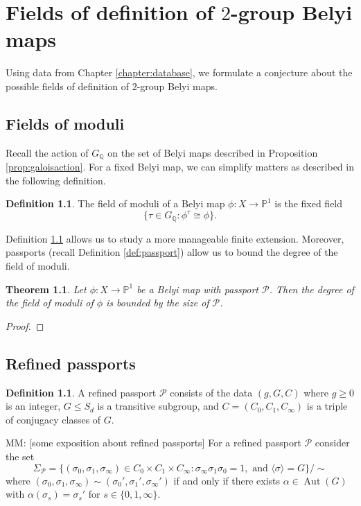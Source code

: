 \documentclass{dcthesis}
\newcommand{\PP}{\mathbb P}
\newcommand{\QQ}{\mathbb Q}
\newcommand{\defi}[1]{\textsf{#1}}
\newcommand{\mm}[1]{{\color{blue} \sf MM: [#1]}}
\DeclareMathOperator{\Aut}{Aut}
\newtheorem{theorem}[prop]{Theorem}
\theoremstyle{definition}
\newtheorem{definition}[prop]{Definition}
\theoremstyle{remark}
\numberwithin{equation}{section}
\numberwithin{figure}{section}
\begin{document}
\chapter{Fields of definition of $2$-group Belyi maps}{\label{chapter:fieldsofdefinition}
  Using data from Chapter \ref{chapter:database},
  we formulate a conjecture about the possible fields of definition of
  $2$-group Belyi maps.
  \section{Fields of moduli}{\label{sec:fieldsofmoduli}}{
    Recall the action of $G_\QQ$ on the set of Belyi maps
    described in Proposition \ref{prop:galoisaction}.
    For a fixed Belyi map,
    we can simplify matters as described in the following definition.
    \begin{definition}\label{def:fieldofmoduli}
      The \defi{field of moduli} of a Belyi map
      $\phi:X\to\PP^1$ is the fixed field
      \[
        \{\tau\in G_\QQ : \phi^\tau\cong\phi\}.
      \]
    \end{definition}
    Definition \ref{def:fieldofmoduli} allows us to study
    a more manageable finite extension.
    Moreover, passports (recall Definition \ref{def:passport})
    allow us to bound the degree of the field of moduli.
    \begin{theorem}\label{thm:fieldofmoduli}
      Let $\phi:X\to\PP^1$ be a Belyi map
      with passport $\mathcal{P}$.
      Then the degree of the field of moduli of $\phi$
      is bounded by the size of $\mathcal{P}$.
    \end{theorem}
    \begin{proof}
    \end{proof}
  }
  \section{Refined passports}{\label{sec:refined}}{
    \begin{definition}\label{def:refined}
      A \defi{refined passport} $\mathcal{P}$ consists of the data
      $(g,G,C)$
      where $g\geq 0$ is an integer,
      $G\leq S_d$ is a transitive subgroup,
      and $C = (C_0,C_1,C_\infty)$
      is a triple of conjugacy classes of $G$.
    \end{definition}
    \mm{some exposition about refined passports}
    For a refined passport $\mathcal{P}$ consider the set
    \[
      \Sigma_\mathcal{P} =
      \{(\sigma_0,\sigma_1,\sigma_\infty)\in C_0\times C_1\times C_\infty : \sigma_\infty\sigma_1\sigma_0=1,\text{ and } \langle\sigma\rangle=G\}/\sim
    \]
    where $(\sigma_0,\sigma_1,\sigma_\infty)\sim(\sigma_0', \sigma_1', \sigma_\infty')$
    if and only if there exists $\alpha\in\Aut(G)$ with
    $\alpha(\sigma_s) = \sigma_s'$ for $s\in\{0,1,\infty\}$.
  }
}
\end{document}
